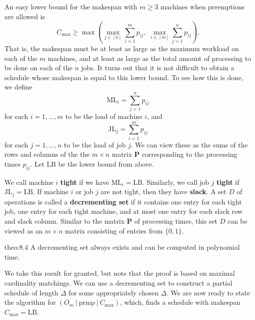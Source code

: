 An easy lower bound for the makespan with $m \geq 3$ machines when 
preemptions are allowed is 
\[ C_{\max} \geq \max \left( \max_{j\in[n]} \sum_{i=1}^m p_{ij},\; 
\max_{i\in[m]} \sum_{j=1}^n p_{ij} \right). \] 
That is, the makespan must be at least as large as the maximum workload 
on each of the $m$ machines, and at least as large as the total amount 
of processing to be done on each of the $n$ jobs. It turns out that 
it is not difficult to obtain a schedule whose makespan is equal to this 
lower bound. To see how this is done, we define 
\[ \text{ML}_i = \sum_{j=1}^n p_{ij} \] 
for each $i = 1, \dots, m$ to be the load of machine $i$, and 
\[ \text{JL}_j = \sum_{i=1}^m p_{ij} \] 
for each $j = 1, \dots, n$ to be the load of job $j$. 
We can view these as the sums of the rows and columns of the 
the $m \times n$ matrix $\mathbf P$ corresponding to the processing times
$p_{ij}$. Let $\text{LB}$ be the lower bound from above. 

We call machine $i$ {\bf tight} if we have $\text{ML}_i = \text{LB}$. 
Similarly, we call job $j$ {\bf tight} if $\text{JL}_j = \text{LB}$. 
If machine $i$ or job $j$ are not tight, then they have {\bf slack}. 
A set $D$ of operations is called a {\bf decrementing set} if it contains 
one entry for each tight job, one entry for each tight machine, 
and at most one entry for each slack row and slack column. 
Similar to the matrix $\mathbf P$ of processing times, this set $D$ can be 
viewed as an $m \times n$ matrix consisting of entries from $\{0, 1\}$. 

\begin{theo}{theo:8.4}
    A decrementing set always exists and can be computed in polynomial time.
\end{theo}

We take this result for granted, but note that the proof is based on 
maximal cardinality matchings. We can use a decrementing set to 
construct a partial schedule of length $\Delta$ for some appropriately 
chosen $\Delta$. We are now ready to state the algorithm for 
$(O_m~|~\text{prmp}~|~C_{\max})$, which, finds a schedule 
with makespan $C_{\max} = \text{LB}$.

